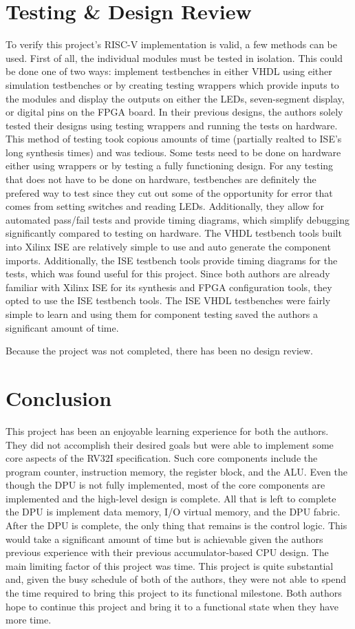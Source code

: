 \documentclass[lettersize,journal]{IEEEtran}
\begin{document}
\section{Testing \& Design Review}
To verify this project's RISC-V implementation is valid, a few methods can be used. First of all, the individual modules must be tested in isolation.
This could be done one of two ways: implement testbenches in either VHDL using either simulation testbenches or by creating testing wrappers which provide inputs to the modules and display the outputs on either the LEDs, seven-segment display, or digital pins on the FPGA board.
In their previous designs, the authors solely tested their designs using testing wrappers and running the tests on hardware.
This method of testing took copious amounts of time (partially realted to ISE's long synthesis times) and was tedious.
Some tests need to be done on hardware either using wrappers or by testing a fully functioning design.
For any testing that does not have to be done on hardware, testbenches are definitely the prefered way to test since they cut out some of the opportunity for error that comes from setting switches and reading LEDs.
Additionally, they allow for automated pass/fail tests and provide timing diagrams, which simplify debugging significantly compared to testing on hardware.
The VHDL testbench tools built into Xilinx ISE are relatively simple to use and auto generate the component imports.
Additionally, the ISE testbench tools provide timing diagrams for the tests, which was found useful for this project.
Since both authors are already familiar with Xilinx ISE for its synthesis and FPGA configuration tools, they opted to use the ISE testbench tools.
The ISE VHDL testbenches were fairly simple to learn and using them for component testing saved the authors a significant amount of time.

Because the project was not completed, there has been no design review.

\section{Conclusion}
This project has been an enjoyable learning experience for both the authors.
They did not accomplish their desired goals but were able to implement some core aspects of the RV32I specification.
Such core components include the program counter, instruction memory, the register block, and the ALU.
Even the though the DPU is not fully implemented, most of the core components are implemented and the high-level design is complete.
All that is left to complete the DPU is implement data memory, I/O virtual memory, and the DPU fabric.
After the DPU is complete, the only thing that remains is the control logic.
This would take a significant amount of time but is achievable given the authors previous experience with their previous accumulator-based CPU design.
The main limiting factor of this project was time.
This project is quite substantial and, given the busy schedule of both of the authors, they were not able to spend the time required to bring this project to its functional milestone.
Both authors hope to continue this project and bring it to a functional state when they have more time.
\end{document}
